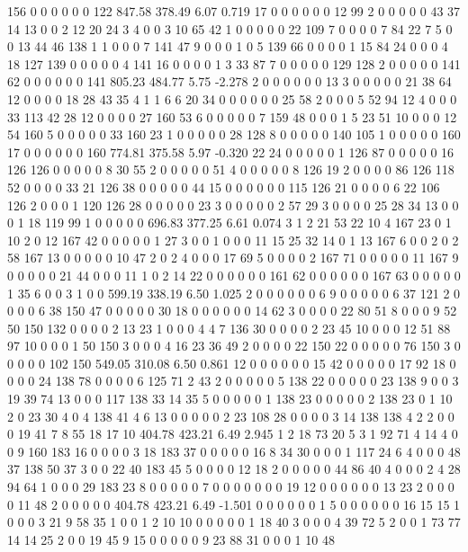  156 0 0 0 0 0 0 122
847.58 378.49 6.07 0.719
 17 0 0 0 0 0 0 12 99 2 0 0 0 0 0 43 37 14 13 0
 0 2 12 20 24 3 4 0 0 3 10 65 42 1 0 0 0 0 0 22
 109 7 0 0 0 0 7 84 22 7 5 0 0 13 44 46 138 1 1 0
 0 0 7 141 47 9 0 0 0 1 0 5 139 66 0 0 0 0 1 15
 84 24 0 0 0 4 18 127 139 0 0 0 0 0 4 141 16 0 0 0
 0 1 3 33 87 7 0 0 0 0 0 129 128 2 0 0 0 0 0 141
 62 0 0 0 0 0 0 141
805.23 484.77 5.75 -2.278
 2 0 0 0 0 0 0 13 3 0 0 0 0 0 21 38 64 12 0 0
 0 0 18 28 43 35 4 1 1 6 6 20 34 0 0 0 0 0 0 25
 58 2 0 0 0 5 52 94 12 4 0 0 0 33 113 42 28 12 0 0
 0 0 27 160 53 6 0 0 0 0 0 7 159 48 0 0 0 1 5 23
 51 10 0 0 0 12 54 160 5 0 0 0 0 0 33 160 23 1 0 0
 0 0 0 28 128 8 0 0 0 0 0 140 105 1 0 0 0 0 0 160
 17 0 0 0 0 0 0 160
774.81 375.58 5.97 -0.320
 22 24 0 0 0 0 0 1 126 87 0 0 0 0 0 16 126 126 0 0
 0 0 0 8 30 55 2 0 0 0 0 0 51 4 0 0 0 0 0 8
 126 19 2 0 0 0 0 86 126 118 52 0 0 0 0 33 21 126 38 0
 0 0 0 0 44 15 0 0 0 0 0 0 115 126 21 0 0 0 0 6
 22 106 126 2 0 0 0 1 120 126 28 0 0 0 0 0 23 3 0 0
 0 0 0 2 57 29 3 0 0 0 0 25 28 34 13 0 0 0 1 18
 119 99 1 0 0 0 0 0
696.83 377.25 6.61 0.074
 3 1 2 21 53 22 10 4 167 23 0 1 10 2 0 12 167 42 0 0
 0 0 0 1 27 3 0 0 1 0 0 0 11 15 25 32 14 0 1 13
 167 6 0 0 2 0 2 58 167 13 0 0 0 0 0 10 47 2 0 2
 4 0 0 0 17 69 5 0 0 0 0 2 167 71 0 0 0 0 0 11
 167 9 0 0 0 0 0 21 44 0 0 0 11 1 0 2 14 22 0 0
 0 0 0 0 161 62 0 0 0 0 0 0 167 63 0 0 0 0 0 1
 35 6 0 0 3 1 0 0
599.19 338.19 6.50 1.025
 2 0 0 0 0 0 0 6 9 0 0 0 0 0 6 37 121 2 0 0
 0 0 6 38 150 47 0 0 0 0 0 30 18 0 0 0 0 0 0 14
 62 3 0 0 0 0 22 80 51 8 0 0 0 9 52 50 150 132 0 0
 0 0 2 13 23 1 0 0 0 4 4 7 136 30 0 0 0 0 2 23
 45 10 0 0 0 12 51 88 97 10 0 0 0 1 50 150 3 0 0 0
 4 16 23 36 49 2 0 0 0 0 22 150 22 0 0 0 0 0 76 150
 3 0 0 0 0 0 102 150
549.05 310.08 6.50 0.861
 12 0 0 0 0 0 0 15 42 0 0 0 0 0 17 92 18 0 0 0
 0 24 138 78 0 0 0 0 6 125 71 2 43 2 0 0 0 0 0 5
 138 22 0 0 0 0 0 23 138 9 0 0 3 19 39 74 13 0 0 0
 117 138 33 14 35 5 0 0 0 0 0 1 138 23 0 0 0 0 0 2
 138 23 0 1 10 2 0 23 30 4 0 4 138 41 4 6 13 0 0 0
 0 0 2 23 108 28 0 0 0 0 3 14 138 138 4 2 2 0 0 0
 19 41 7 8 55 18 17 10
404.78 423.21 6.49 2.945
 1 2 18 73 20 5 3 1 92 71 4 14 4 0 0 9 160 183 16 0
 0 0 0 3 18 183 37 0 0 0 0 0 16 8 34 30 0 0 0 1
 117 24 6 4 0 0 0 48 37 138 50 37 3 0 0 22 40 183 45 5
 0 0 0 0 12 18 2 0 0 0 0 0 44 86 40 4 0 0 0 2
 4 28 94 64 1 0 0 0 29 183 23 8 0 0 0 0 0 7 0 0
 0 0 0 0 0 19 12 0 0 0 0 0 0 13 23 2 0 0 0 0
 11 48 2 0 0 0 0 0
404.78 423.21 6.49 -1.501
 0 0 0 0 0 0 1 5 0 0 0 0 0 0 16 15 15 1 0 0
 0 3 21 9 58 35 1 0 0 1 2 10 10 0 0 0 0 0 1 18
 40 3 0 0 0 4 39 72 5 2 0 0 1 73 77 14 14 25 2 0
 0 19 45 9 15 0 0 0 0 0 9 23 88 31 0 0 0 1 10 48
